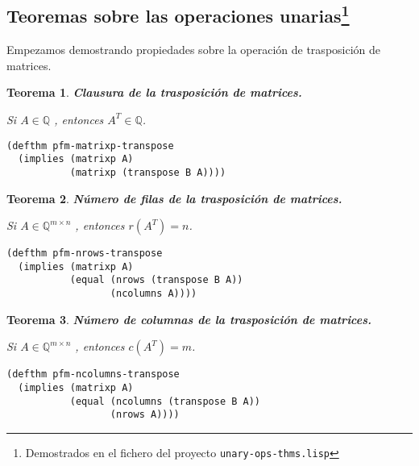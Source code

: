 \documentclass[a4paper,10pt]{article}
\newcommand{\Q}[1]{#1 \in \mathbb{Q}}
\newcommand{\M}[3]{#1 \in \mathbb{Q}^{#2 \times #3}}
\newtheorem{teor}{{Teorema}}
\begin{document}
\vspace{12pt}
\subsection[Teoremas sobre las operaciones unarias]{Teoremas sobre las operaciones unarias\footnote{Demostrados en el fichero del proyecto \texttt{unary-ops-thms.lisp}}}
\vspace{10pt}

Empezamos demostrando propiedades sobre la operación de trasposición de matrices.

\par \vspace{16pt}

\begin{teor} \textbf{Clausura de la trasposición de matrices.}\vspace{8pt}\par
Si $\Q{A}$ , entonces $\Q{A^T}$.
\end{teor}

\begin{lstlisting}[language=clips]
(defthm pfm-matrixp-transpose
  (implies (matrixp A)
           (matrixp (transpose B A))))
\end{lstlisting}

\par \vspace{16pt}

\begin{teor} \textbf{Número de filas de la trasposición de matrices.}\vspace{8pt}\par
Si $\M{A}{m}{n}$ , entonces $r(A^T) = n$.
\end{teor}

\begin{lstlisting}[language=clips]
(defthm pfm-nrows-transpose
  (implies (matrixp A)
           (equal (nrows (transpose B A))
                  (ncolumns A))))
\end{lstlisting}

\par \vspace{16pt}

\begin{teor} \textbf{Número de columnas de la trasposición de matrices.}\vspace{8pt}\par
Si $\M{A}{m}{n}$ , entonces $c(A^T) = m$.
\end{teor}

\begin{lstlisting}[language=clips]
(defthm pfm-ncolumns-transpose
  (implies (matrixp A)
           (equal (ncolumns (transpose B A))
                  (nrows A))))
\end{lstlisting}
\end{document}
